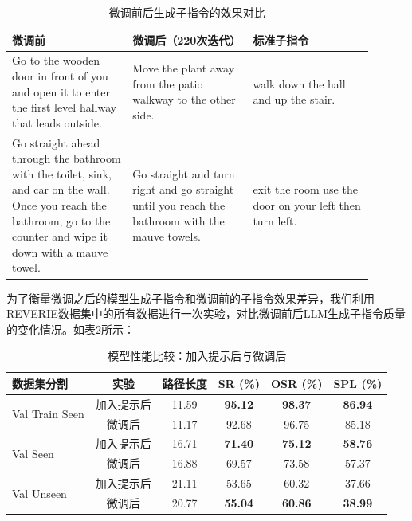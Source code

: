 \documentclass[bachelor]{thesis-uestc}
\begin{document}
\begin{table}[htbp]
    \centering
    \caption{微调前后生成子指令的效果对比}
    \begin{tabular}{>{\raggedright}p{0.3\linewidth}>{\raggedright}p{0.3\linewidth}>{\raggedright\arraybackslash}p{0.3\linewidth}}
    \toprule
    \textbf{微调前} & \textbf{微调后（220次迭代）} & \textbf{标准子指令} \\
    \midrule
    Go to the wooden door in front of you and open it to enter the first level hallway that leads outside. & Move the plant away from the patio walkway to the other side. & walk down the hall and up the stair. \\
    \addlinespace
    Go straight ahead through the bathroom with the toilet, sink, and car on the wall. Once you reach the bathroom, go to the counter and wipe it down with a mauve towel. & Go straight and turn right and go straight until you reach the bathroom with the mauve towels. & exit the room use the door on your left then turn left. \\
    \bottomrule
    \end{tabular}
    \label{cmp}
    \end{table}


为了衡量微调之后的模型生成子指令和微调前的子指令效果差异，我们利用REVERIE数据集中的所有数据进行一次实验，对比微调前后LLM生成子指令质量的变化情况。如表\ref{table:model_comparison}所示：

\begin{table}[htbp]
    \centering
    \caption{模型性能比较：加入提示后与微调后}
    \label{table:model_comparison}
    \begin{tabular}{@{}lccccc@{}}
    \toprule
    \textbf{数据集分割} & \textbf{实验} & \textbf{路径长度} & \textbf{SR (\%)} & \textbf{OSR (\%)} & \textbf{SPL (\%)} \\ \midrule
    \multirow{2}{*}{Val Train Seen} & 加入提示后 & 11.59 & \textbf{95.12} & \textbf{98.37} & \textbf{86.94} \\
                                    & 微调后 & 11.17 & 92.68 & 96.75 & 85.18 \\ \midrule
    \multirow{2}{*}{Val Seen}       & 加入提示后 & 16.71 & \textbf{71.40} & \textbf{75.12} & \textbf{58.76} \\
                                    & 微调后 & 16.88 & 69.57 & 73.58 & 57.37 \\ \midrule
    \multirow{2}{*}{Val Unseen}     & 加入提示后 & 21.11 & 53.65 & 60.32 & 37.66 \\
                                    & 微调后 & 20.77 & \textbf{55.04} & \textbf{60.86} & \textbf{38.99} \\
    \bottomrule
    \end{tabular}
\end{table}
\end{document}
